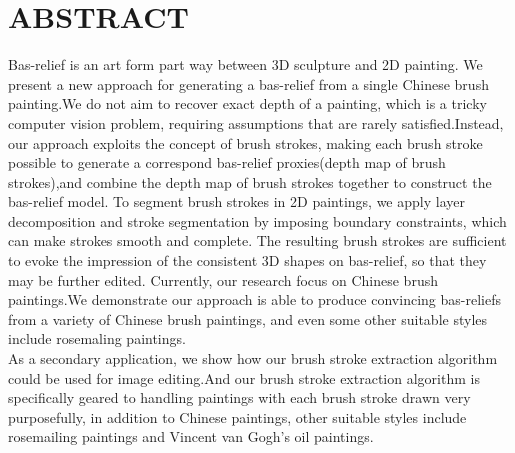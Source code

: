 \section*{\centering ABSTRACT}
Bas-relief is an art form part way between 3D sculpture and 2D painting. We present a new approach for generating a bas-relief from a single Chinese brush painting.We do not aim to recover exact depth of a painting, which is a tricky computer vision problem, requiring assumptions that are rarely satisfied.Instead, our approach exploits the concept of brush strokes, making each brush stroke possible to generate a correspond bas-relief proxies(depth map of brush strokes),and combine the depth map of brush strokes together to construct the bas-relief model. To segment brush strokes in 2D paintings, we apply layer decomposition and stroke segmentation by imposing boundary constraints, which can make strokes smooth and complete. The resulting brush strokes are sufficient to evoke the impression of the consistent 3D shapes on bas-relief, so that they may be further edited. Currently, our research focus on Chinese brush paintings.We demonstrate our approach is able to produce convincing bas-reliefs from a variety of Chinese brush paintings, and even some other suitable styles include rosemaling paintings. \\
As a secondary application, we show how our brush stroke extraction algorithm could be used for image editing.And our brush stroke extraction algorithm is specifically geared to handling paintings with each brush stroke drawn very purposefully, in addition to Chinese paintings, other suitable styles include rosemailing paintings and Vincent van Gogh's oil paintings.

\newpage


 

